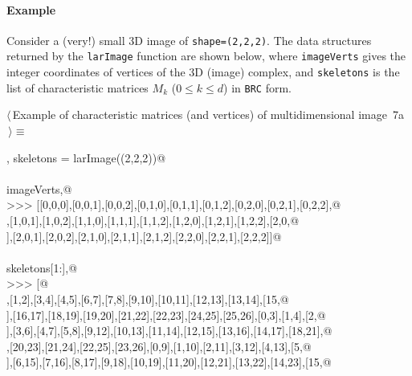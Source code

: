 \documentclass[11pt,oneside]{article}	%
\begin{document}
\paragraph{Example}
Consider a (very!) small 3D image of \texttt{shape=(2,2,2)}. The data structures returned by the \texttt{larImage} function are shown below, where \texttt{imageVerts} gives the integer coordinates of vertices of the 3D (image) complex, and \texttt{skeletons} is the list of characteristic matrices $M_k$ ($0\leq k\leq d$) in \texttt{BRC} form.

\begin{flushleft} \small
\begin{minipage}{\linewidth} \label{scrap10}
\protect{}$\langle\,$Example of characteristic matrices (and vertices) of multidimensional image\nobreak\ {\footnotesize 7a}$\,\rangle\equiv$
\vspace{-1ex}
\begin{list}{}{} \item
\mbox{}\verb@imageVerts, skeletons = larImage((2,2,2))@\\
\mbox{}\verb@@\\
\mbox{}\verb@print imageVerts,@\\
\mbox{}\verb@>>> [[0,0,0],[0,0,1],[0,0,2],[0,1,0],[0,1,1],[0,1,2],[0,2,0],[0,2,1],[0,2,2],@\\
\mbox{}\verb@[1,0,0],[1,0,1],[1,0,2],[1,1,0],[1,1,1],[1,1,2],[1,2,0],[1,2,1],[1,2,2],[2,0,@\\
\mbox{}],[2,0,1],[2,0,2],[2,1,0],[2,1,1],[2,1,2],[2,2,0],[2,2,1],[2,2,2]]@\\
\mbox{}\verb@@\\
\mbox{}\verb@print skeletons[1:],@\\
\mbox{}\verb@>>> [@\\
\mbox{}\verb@[[0,1],[1,2],[3,4],[4,5],[6,7],[7,8],[9,10],[10,11],[12,13],[13,14],[15,@\\
\mbox{}],[16,17],[18,19],[19,20],[21,22],[22,23],[24,25],[25,26],[0,3],[1,4],[2,@\\
\mbox{}],[3,6],[4,7],[5,8],[9,12],[10,13],[11,14],[12,15],[13,16],[14,17],[18,21],@\\
\mbox{}\verb@[19,22],[20,23],[21,24],[22,25],[23,26],[0,9],[1,10],[2,11],[3,12],[4,13],[5,@\\
\mbox{}],[6,15],[7,16],[8,17],[9,18],[10,19],[11,20],[12,21],[13,22],[14,23],[15,@\\

\end{list}
\end{minipage}
\end{flushleft}
\end{document}
